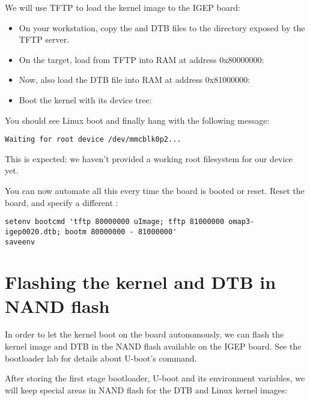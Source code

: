 We will use TFTP to load the kernel image to the IGEP board:

\begin{itemize}

\item On your workstation, copy the  and DTB files to the
  directory exposed by the TFTP server.

\item On the target, load  from TFTP into RAM at address
  0x80000000:\\

\item Now, also load the DTB file into RAM at address 0x81000000:\\

\item Boot the kernel with its device tree:\\

\end{itemize}

You should see Linux boot and finally hang with the following message:

\begin{verbatim}
Waiting for root device /dev/mmcblk0p2...
\end{verbatim}

This is expected: we haven't provided a working root filesystem for
our device yet.

You can now automate all this every time the board is booted or
reset. Reset the board, and specify a different :

{\scriptsize
\begin{verbatim}
setenv bootcmd 'tftp 80000000 uImage; tftp 81000000 omap3-igep0020.dtb; bootm 80000000 - 81000000'
saveenv
\end{verbatim}
}

\section{Flashing the kernel and DTB in NAND flash}

In order to let the kernel boot on the board autonomously, we can
flash the kernel image and DTB in the NAND flash available on the IGEP
board. See the bootloader lab for details about U-boot's 
command.

After storing the first stage bootloader, U-boot and its environment
variables, we will keep special areas in NAND flash for the DTB
and Linux kernel images:

